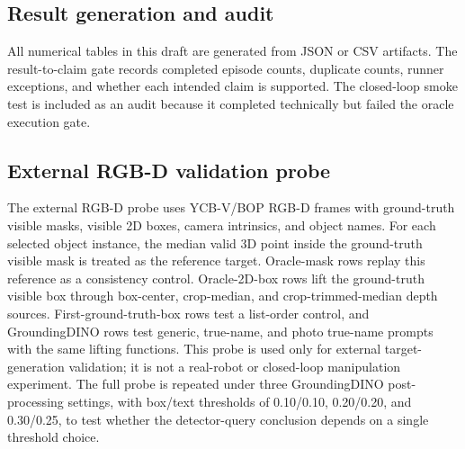 \subsection{Result generation and audit}

All numerical tables in this draft are generated from JSON or CSV artifacts. The result-to-claim gate records completed episode counts, duplicate counts, runner exceptions, and whether each intended claim is supported. The closed-loop smoke test is included as an audit because it completed technically but failed the oracle execution gate.

\subsection{External RGB-D validation probe}

The external RGB-D probe uses YCB-V/BOP RGB-D frames with ground-truth visible masks, visible 2D boxes, camera intrinsics, and object names. For each selected object instance, the median valid 3D point inside the ground-truth visible mask is treated as the reference target. Oracle-mask rows replay this reference as a consistency control. Oracle-2D-box rows lift the ground-truth visible box through box-center, crop-median, and crop-trimmed-median depth sources. First-ground-truth-box rows test a list-order control, and GroundingDINO rows test generic, true-name, and photo true-name prompts with the same lifting functions. This probe is used only for external target-generation validation; it is not a real-robot or closed-loop manipulation experiment. The full probe is repeated under three GroundingDINO post-processing settings, with box/text thresholds of 0.10/0.10, 0.20/0.20, and 0.30/0.25, to test whether the detector-query conclusion depends on a single threshold choice.
